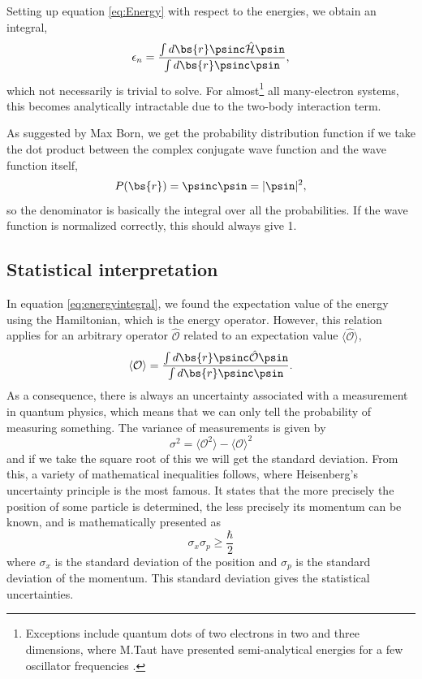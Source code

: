 Setting up equation \eqref{eq:Energy} with respect to the energies, we obtain an integral,
\begin{equation}
\epsilon_n=\frac{\int d\bs{r}\psinc\hat{\mathcal{H}}\psin}{\int d\bs{r}\psinc\psin},
\label{eq:energyintegral}
\end{equation}
which not necessarily is trivial to solve. For almost\footnote{Exceptions include quantum dots of two electrons in two and three dimensions, where M.Taut have presented semi-analytical energies for a few oscillator frequencies \cite{taut_two_1993,taut_two_1994}.} all many-electron systems, this becomes analytically intractable due to the two-body interaction term.

As suggested by Max Born, we get the probability distribution function if we take the dot product between the complex conjugate wave function and the wave function itself,
\begin{equation}
P(\bs{r})=\psinc\psin=|\psin|^2,
\label{eq:pdf}
\end{equation}
so the denominator is basically the integral over all the probabilities. If the wave function is normalized correctly, this should always give 1. 

\subsection{Statistical interpretation}
In equation \eqref{eq:energyintegral}, we found the expectation value of the energy using the Hamiltonian, which is the energy operator. However, this relation applies for an arbitrary operator $\mathcal{\hat{O}}$ related to an expectation value $\langle \mathcal{\hat{O}}\rangle$,
\begin{equation}
\langle \mathcal{O}\rangle=\frac{\int d\bs{r}\psinc\hat{\mathcal{O}}\psin}{\int d\bs{r}\psinc\psin}.
\label{eq:generalexp}
\end{equation}
As a consequence, there is always an uncertainty associated with a measurement in quantum physics, which means that we can only tell the probability of measuring something. The variance of measurements is given by
\begin{equation}
\sigma^2=\langle \mathcal{O}^2\rangle-\langle \mathcal{O}\rangle^2
\label{eq:variance}
\end{equation}
and if we take the square root of this we will get the standard deviation.
From this, a variety of mathematical inequalities follows, where Heisenberg's uncertainty principle is the most famous. It states that the more precisely the position of some particle is determined, the less precisely its momentum can be known, and is mathematically presented as
\begin{equation}
\sigma_x\sigma_p\geq\frac{\hbar}{2}
\end{equation}
where $\sigma_x$ is the standard deviation of the position and $\sigma_p$ is the standard deviation of the momentum. This standard deviation gives the statistical uncertainties. 

